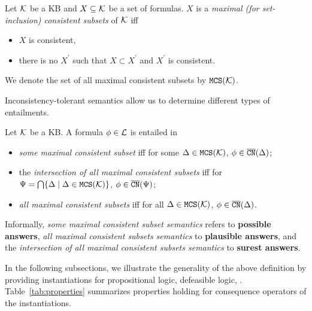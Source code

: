 \begin{definition} Let $\mathcal{K}$ be a KB and $X \subseteq \mathcal{K}$ be a set of formulas. $X$ is a \emph{maximal (for set-inclusion) consistent subsets} of $\mathcal{K}$ iff 
\begin{itemize}
    \item $X$ is consistent,
    \item there is no $X^{\prime}$ such that $X \subset X^{\prime}$ and $X^{\prime}$ is consistent.
\end{itemize}
 We denote the set of all maximal consistent subsets by $\texttt{\textup{MCS}}(\mathcal{K})$.
\end{definition}

Inconsistency-tolerant semantics allow us to determine different types of entailments.
\begin{definition}
Let $\mathcal{K}$ be a KB. A formula $\phi \in \mathcal{L}$ is entailed in
\begin{itemize}
    \item  \emph{some maximal consistent subset}  iff for some $\Delta \in \texttt{\textup{MCS}}(\mathcal{K})$, $\phi \in \overline{\texttt{\textup{CN}}}(\Delta)$;

    \item the \emph{intersection of all maximal consistent subsets} iff for $\Psi = \bigcap \{\Delta \mid \Delta \in \texttt{\textup{MCS}}(\mathcal{K})\}$, $\phi \in \overline{\texttt{\textup{CN}}}(\Psi)$;

    \item   \emph{all maximal consistent subsets} iff for all $\Delta \in \texttt{\textup{MCS}}(\mathcal{K})$, $\phi \in \overline{\texttt{\textup{CN}}}(\Delta)$.
\end{itemize}  
\end{definition}

Informally, \textit{some maximal consistent subset semantics} refers to \textbf{possible answers}, \textit{all maximal consistent subsets semantics} to \textbf{plausible answers}, and the \emph{intersection of all maximal consistent subsets semantics} to \textbf{surest answers}.

In the following subsections, we illustrate the generality of the above definition by providing instantiations for propositional logic, defeasible logic, \datalogPM.
Table~\ref{tab:properties} summarizes properties holding for consequence operators of the instantiations.

